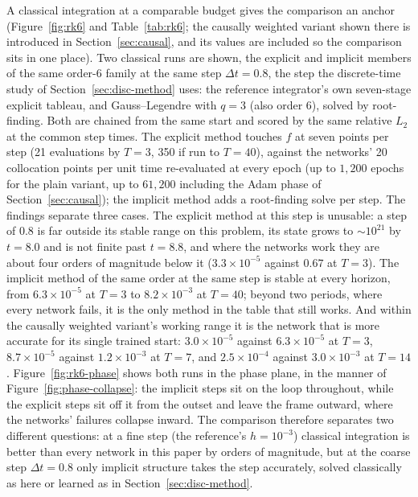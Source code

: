 \documentclass[11pt,a4paper]{article}
\begin{document}
A classical integration at a comparable budget gives the comparison an
anchor (Figure~\ref{fig:rk6} and Table~\ref{tab:rk6}; the causally
weighted variant shown there is introduced in
Section~\ref{sec:causal}, and its values are included so the comparison
sits in one place). Two classical runs are shown, the explicit and
implicit members of the same order-6 family at the same step
$\Delta t = 0.8$, the step the discrete-time study of
Section~\ref{sec:disc-method} uses: the reference integrator's own
seven-stage explicit tableau, and Gauss--Legendre with $q = 3$ (also
order 6), solved by root-finding. Both are chained from the same start
and scored by the same relative $L_2$ at the common step times. The
explicit method touches $f$ at seven points per step (21 evaluations by
$T = 3$, 350 if run to $T = 40$), against the networks' 20 collocation
points per unit time re-evaluated at every epoch (up to $1{,}200$
epochs for the plain variant, up to $61{,}200$ including the Adam phase
of Section~\ref{sec:causal}); the implicit method adds a root-finding
solve per step. The findings separate three cases. The explicit method
at this step is unusable: a step of $0.8$ is far outside its stable
range on this problem, its state grows to $\sim\!10^{21}$ by $t = 8.0$
and is not finite past $t = 8.8$, and where the networks work they are
about four orders of magnitude below it ($3.3\times10^{-5}$ against
$0.67$ at $T = 3$). The implicit method of the same order at the same
step is stable at every horizon, from $6.3\times10^{-5}$ at $T = 3$ to
$8.2\times10^{-3}$ at $T = 40$; beyond two periods, where every network
fails, it is the only method in the table that still works. And within
the causally weighted variant's working range it is the network that is
more accurate for its single trained start: $3.0\times10^{-5}$ against
$6.3\times10^{-5}$ at $T = 3$, $8.7\times10^{-5}$ against
$1.2\times10^{-3}$ at $T = 7$, and $2.5\times10^{-4}$ against
$3.0\times10^{-3}$ at $T = 14$. Figure~\ref{fig:rk6-phase} shows both
runs in the phase plane, in the manner of
Figure~\ref{fig:phase-collapse}: the implicit steps sit on the loop
throughout, while the explicit steps sit off it from the outset and
leave the frame outward, where the networks' failures collapse inward.
The comparison therefore separates two different questions: at a fine
step (the reference's $h = 10^{-3}$) classical integration is better
than every network in this paper by orders of magnitude, but at the
coarse step $\Delta t = 0.8$ only implicit structure takes the step
accurately, solved classically as here or learned as in
Section~\ref{sec:disc-method}.
\end{document}
